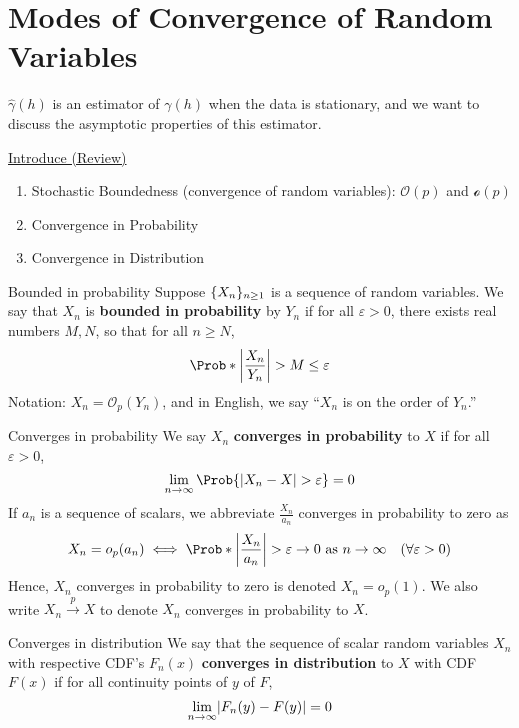 \section{Modes of Convergence of Random Variables}
$ \hat{\gamma}(h) $ is an estimator of $ \gamma(h) $ when the data is stationary,
and we want to discuss the asymptotic properties of this estimator.

\underline{Introduce (Review)}
\begin{enumerate}
    \item Stochastic Boundedness (convergence of random variables): $ \mathcal{O}(p) $
          and $ \mathcal{o}(p) $
    \item Convergence in Probability
    \item Convergence in Distribution
\end{enumerate}
\begin{Definition}{Bounded in probability}{}
    Suppose $ \{X_n\}_{n\ge 1} $ is a sequence of random variables.
    We say that $ X_n $ is \textbf{bounded in probability}
    by $ Y_n $ if for all $ \varepsilon>0 $, there exists real numbers
    $ M,N $, so that for all $ n\ge N $,
    \[ \Prob*{\abs*{\frac{X_n}{Y_n}}> M}\le \varepsilon
    \]
    Notation: $ X_n=\mathcal{O}_p(Y_n) $, and in English, we say
    ``$ X_n $ is on the order of $ Y_n $.''
\end{Definition}
\begin{Definition}{Converges in probability}{}
    We say $ X_n $ \textbf{converges in probability}
    to $ X $ if for all $ \varepsilon>0 $,
    \[ \lim\limits_{{n} \to {\infty}} \Prob{\abs{X_n-X}>\varepsilon}=0 \]
    If $ a_n $ is a sequence of scalars, we abbreviate
    $ \displaystyle \frac{X_n}{a_n} $
    converges in probability to zero as
    \[ X_n=o_p(a_n)\iff \Prob*{\abs*{\frac{X_n}{a_n}}>\varepsilon}\to 0\text{ as }
        n\to\infty\quad (\forall\varepsilon>0) \]
    Hence, $ X_n $
    converges in probability to zero is denoted $ X_n=o_p(1) $.
    We also write $ X_n\stackrel{p}{\to}X $ to denote $ X_n $
    converges in probability to $ X $.
\end{Definition}
\begin{Definition}{Converges in distribution}{}
    We say that the sequence of scalar random variables
    $ X_n $ with respective CDF's $ F_n(x) $
    \textbf{converges in distribution} to $ X $ with CDF $ F(x) $
    if for all continuity points of $ y $ of $ F $,
    \[ \lim\limits_{{n} \to {\infty}} \lvert F_n(y)-F(y)\rvert=0 \]
\end{Definition}
